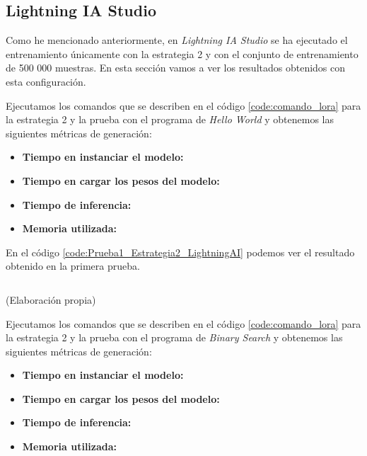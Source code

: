 \subsection{Lightning IA Studio}
\label{subsec:lightning_ia_studio}


Como he mencionado anteriormente, en \textit{Lightning IA Studio} se ha ejecutado el
entrenamiento únicamente con la estrategia 2 y con el conjunto de entrenamiento de
500 000 muestras. En esta sección vamos a ver los resultados obtenidos con esta
configuración.

Ejecutamos los comandos que se describen en el código \ref{code:comando_lora} para
la estrategia 2 y la prueba con el programa de \textit{Hello World} y obtenemos
las siguientes métricas de generación:

\begin{itemize}
    \item \textbf{Tiempo en instanciar el modelo:}
    \item \textbf{Tiempo en cargar los pesos del modelo:}
    \item \textbf{Tiempo de inferencia:}
    \item \textbf{Memoria utilizada:}
\end{itemize}

En el código \ref{code:Prueba1_Estrategia2_LightningAI} podemos ver el resultado obtenido
en la primera prueba.

\begin{mycode}
    \begin{verbatim}

    \end{verbatim}
    \caption[]{ (Elaboración propia)}
    \label{code:Prueba1_Estrategia2_LightningAI}
\end{mycode}

Ejecutamos los comandos que se describen en el código \ref{code:comando_lora} para
la estrategia 2 y la prueba con el programa de \textit{Binary Search} y obtenemos
las siguientes métricas de generación:

\begin{itemize}
    \item \textbf{Tiempo en instanciar el modelo:}
    \item \textbf{Tiempo en cargar los pesos del modelo:}
    \item \textbf{Tiempo de inferencia:}
    \item \textbf{Memoria utilizada:}
\end{itemize}


